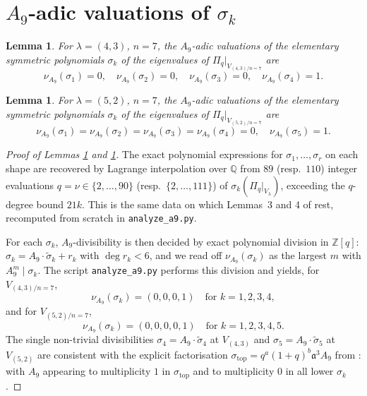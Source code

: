 \documentclass[11pt]{article}
\theoremstyle{plain}
\newtheorem{lemma}[theorem]{Lemma}
\theoremstyle{definition}
\theoremstyle{remark}
\newcommand{\Z}{\mathbb{Z}}
\newcommand{\Q}{\mathbb{Q}}
\newcommand{\Pibs}{\Pi_q}
\newcommand{\Vlam}{V_\lambda}
\newcommand{\valA}{\nu_{A_9}}
\newcommand{\atom}{\mathfrak{a}}
\begin{document}
\section{$A_9$-adic valuations of $\sigma_k$}

\begin{lemma}
\label{lem:nu43}
For $\lambda = (4,3)$, $n = 7$, the $A_9$-adic valuations of the elementary
symmetric polynomials $\sigma_k$ of the eigenvalues of $\Pibs|_{V_{(4,3)/n=7}}$ are
\[ \valA(\sigma_1) = 0, \quad \valA(\sigma_2) = 0, \quad \valA(\sigma_3) = 0,
   \quad \valA(\sigma_4) = 1. \]
\end{lemma}

\begin{lemma}
\label{lem:nu52}
For $\lambda = (5,2)$, $n = 7$, the $A_9$-adic valuations of the elementary
symmetric polynomials $\sigma_k$ of the eigenvalues of $\Pibs|_{V_{(5,2)/n=7}}$ are
\[ \valA(\sigma_1) = \valA(\sigma_2) = \valA(\sigma_3) = \valA(\sigma_4) = 0,
   \quad \valA(\sigma_5) = 1. \]
\end{lemma}

\begin{proof}[Proof of Lemmas \ref{lem:nu43} and \ref{lem:nu52}]
The exact polynomial expressions for $\sigma_1, \ldots, \sigma_r$ on each shape
are recovered by Lagrange interpolation over $\Q$ from $89$ (resp.\ $110$)
integer evaluations $q = \nu \in \{2, \ldots, 90\}$ (resp.\ $\{2, \ldots, 111\}$)
of $\sigma_k(\Pibs|_{\Vlam})$, exceeding the $q$-degree bound $21k$.  This is
the same data on which Lemmas~3 and 4 of \cite{Newton28} rest, recomputed from
scratch in \texttt{analyze\_a9.py}.

For each $\sigma_k$, $A_9$-divisibility is then decided by exact polynomial
division in $\Z[q]$: $\sigma_k = A_9 \cdot \tilde\sigma_k + r_k$ with $\deg r_k < 6$,
and we read off $\valA(\sigma_k)$ as the largest $m$ with $A_9^m \mid \sigma_k$.
The script \texttt{analyze\_a9.py} performs this division and yields, for
$V_{(4,3)/n=7}$,
\[ \valA(\sigma_k) = (0, 0, 0, 1) \quad \text{for } k = 1, 2, 3, 4, \]
and for $V_{(5,2)/n=7}$,
\[ \valA(\sigma_k) = (0, 0, 0, 0, 1) \quad \text{for } k = 1, 2, 3, 4, 5. \]
The single non-trivial divisibilities $\sigma_4 = A_9 \cdot \tilde\sigma_4$ at
$V_{(4,3)}$ and $\sigma_5 = A_9 \cdot \tilde\sigma_5$ at $V_{(5,2)}$ are
consistent with the explicit factorisation $\sigma_{\mathrm{top}} = q^a (1+q)^b
\atom^3 A_9$ from \cite[\S 4]{Newton28}: with $A_9$ appearing to multiplicity $1$
in $\sigma_{\mathrm{top}}$ and to multiplicity $0$ in all lower $\sigma_k$.
\end{proof}
\end{document}
